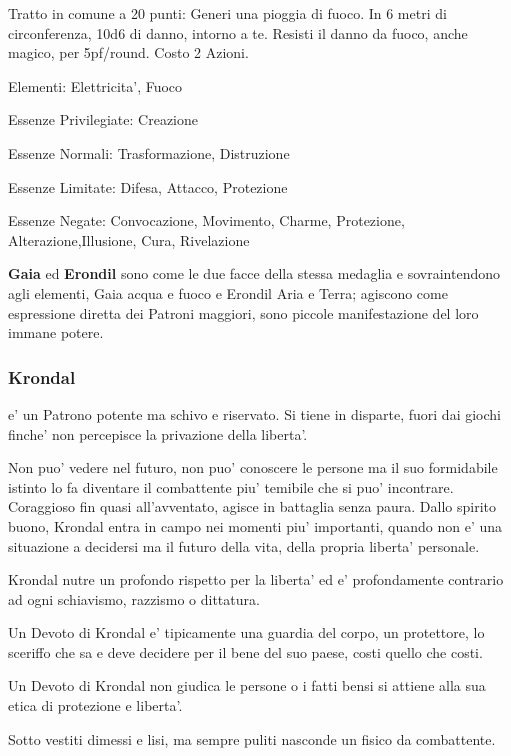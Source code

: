 \documentclass[a4paper,11pt,twoside,openany]{book}
\begin{document}
{Tratto in comune a 20 punti: Generi una pioggia di fuoco. In 6 metri di circonferenza, 10d6 di danno, intorno a te. Resisti il danno da fuoco, anche magico, per 5pf/round. Costo 2 Azioni.

\bigskip

Elementi: Elettricita', Fuoco

\bigskip

Essenze Privilegiate: Creazione

Essenze Normali: Trasformazione, Distruzione

Essenze Limitate: Difesa, Attacco, Protezione

Essenze Negate: Convocazione, Movimento, Charme, Protezione, Alterazione,Illusione, Cura, Rivelazione

\bigskip

\textbf{Gaia} ed \textbf{Erondil} sono come le due facce della stessa medaglia e sovraintendono agli elementi, Gaia acqua e fuoco e Erondil Aria e Terra; agiscono come espressione diretta dei Patroni maggiori, sono piccole manifestazione del loro immane potere.

\subsubsection{Krondal}

\label{krondal}

e' un Patrono potente ma schivo e riservato. Si tiene in disparte, fuori dai giochi finche' non percepisce la privazione della liberta'.

Non puo' vedere nel futuro, non puo' conoscere le persone ma il suo formidabile istinto lo fa diventare il combattente piu' temibile che si puo' incontrare. Coraggioso fin quasi all'avventato, agisce in battaglia senza paura. Dallo spirito buono, Krondal entra in campo nei momenti piu' importanti, quando non e' una situazione a decidersi ma il futuro della vita, della propria liberta' personale.

Krondal nutre un profondo rispetto per la liberta' ed e' profondamente contrario ad ogni schiavismo, razzismo o dittatura.

Un Devoto di Krondal e' tipicamente una guardia del corpo, un protettore, lo sceriffo che sa e deve decidere per il bene del suo paese, costi quello che costi. 

Un Devoto di Krondal non giudica le persone o i fatti bensi si attiene alla sua etica di protezione e liberta'.

Sotto vestiti dimessi e lisi, ma sempre puliti nasconde un fisico da combattente.

}
\end{document}
